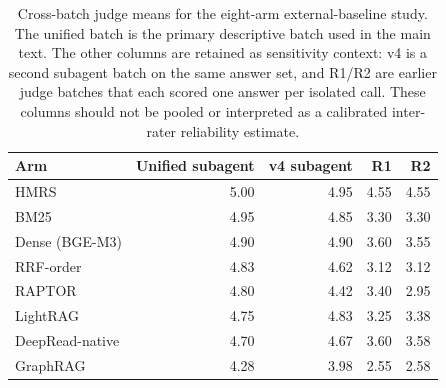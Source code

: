 \begin{table}[!t]
\centering
\scriptsize
\setlength{\tabcolsep}{3pt}
\caption{Cross-batch judge means for the eight-arm external-baseline study.
The unified batch is the primary descriptive batch used in the main text.
The other columns are retained as sensitivity context: v4 is a second
subagent batch on the same answer set, and R1/R2 are earlier judge batches
that each scored one answer per isolated call. These columns should not be
pooled or interpreted as a calibrated
inter-rater reliability estimate.}
\label{tab:external-cross-batch}
\begin{tabular}{@{}lrrrr@{}}
\toprule
Arm & Unified subagent & v4 subagent & R1 & R2\\
\midrule
HMRS & 5.00 & 4.95 & 4.55 & 4.55\\
BM25 & 4.95 & 4.85 & 3.30 & 3.30\\
Dense (BGE-M3) & 4.90 & 4.90 & 3.60 & 3.55\\
RRF-order & 4.83 & 4.62 & 3.12 & 3.12\\
RAPTOR & 4.80 & 4.42 & 3.40 & 2.95\\
LightRAG & 4.75 & 4.83 & 3.25 & 3.38\\
DeepRead-native & 4.70 & 4.67 & 3.60 & 3.58\\
GraphRAG & 4.28 & 3.98 & 2.55 & 2.58\\
\bottomrule
\end{tabular}
\end{table}

